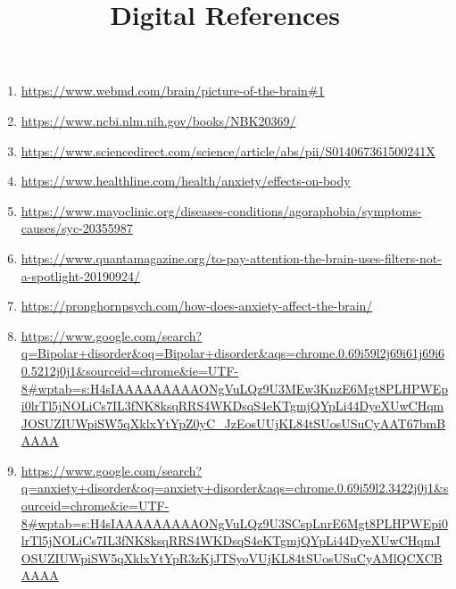 \documentclass{article}
\renewcommand{\maketitle}{
    \begin{center}{\huge\bfseries\thetitle}
        \\ [0.5ex]
        \thedate
        \\ [0.5ex]
        \theauthor
        \\ [0.5ex]
        \hline
        \vspace{1.5cm}
    \end{center}
}
\begin{document}
\newpage
\thispagestyle{empty}
\renewcommand{\maketitle}{
    {\huge\bfseries\thetitle}
    \vspace{0.5em}
    \hline
}

\title{Digital References}
\maketitle

\begin{center}
    \begin{enumerate}

        \item{\url{https://www.webmd.com/brain/picture-of-the-brain#1}} \\
        [1em]
        \item{\url{https://www.ncbi.nlm.nih.gov/books/NBK20369/}} \\
        [1em]
        \item\url{https://www.sciencedirect.com/science/article/abs/pii/S014067361500241X} \\
        [1em]
        \item{\url{https://www.healthline.com/health/anxiety/effects-on-body}} \\
        [1em]
        \item{\url{https://www.mayoclinic.org/diseases-conditions/agoraphobia/symptoms-causes/syc-20355987}} \\
        [1em]
        \item{\url{https://www.quantamagazine.org/to-pay-attention-the-brain-uses-filters-not-a-spotlight-20190924/}} \\
        [1em]
        \item{\url{https://pronghornpsych.com/how-does-anxiety-affect-the-brain/}} \\
        [1em]
        \item{\url{https://www.google.com/search?q=Bipolar+disorder&oq=Bipolar+disorder&aqs=chrome.0.69i59l2j69i61j69i60.5212j0j1&sourceid=chrome&ie=UTF-8#wptab=s:H4sIAAAAAAAAAONgVuLQz9U3MEw3KnzE6Mgt8PLHPWEpi0lrTl5jNOLiCs7IL3fNK8ksqRRS4WKDsqS4eKTgmjQYpLi44DyeXUwCHqmJOSUZIUWpiSW5qXklxYtYpZ0yC_JzEosUUjKL84tSUosUSuCyAAT67bmBAAAA}} \\
        [1em]
        \item{\url{https://www.google.com/search?q=anxiety+disorder&oq=anxiety+disorder&aqs=chrome.0.69i59l2.3422j0j1&sourceid=chrome&ie=UTF-8#wptab=s:H4sIAAAAAAAAAONgVuLQz9U3SCspLnrE6Mgt8PLHPWEpi0lrTl5jNOLiCs7IL3fNK8ksqRRS4WKDsqS4eKTgmjQYpLi44DyeXUwCHqmJOSUZIUWpiSW5qXklxYtYpR3zKjJTSyoVUjKL84tSUosUSuCyAMlQCXCBAAAA} \\
}
\end{enumerate}
\end{center}
\end{document}
